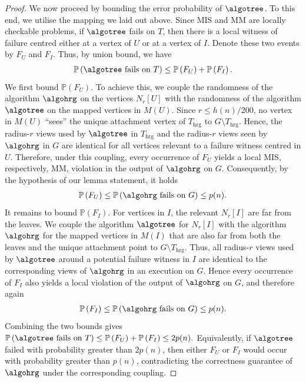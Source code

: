\documentclass[letterpaper,11pt]{article}
\newcommand{\Pro}[1]{\mathbb{P}\left(#1\right)}
\newcommand{\1}{\mathbb I}
\begin{document}
\begin{proof}
We now proceed by bounding the error probability of $\algotree$. To this end, we utilise the mapping we laid out above. Since MIS and MM are locally checkable problems, if $\algotree$ fails on $T$, then there is a local witness of failure centred either at a vertex of $U$ or at a vertex of $I$. Denote these two events by $F_U$ and $F_I$. Thus, by union bound, we have
%
\begin{align*}
\Pro{\algotree \text{ fails on } T}
\le \Pro{F_U}+\Pro{F_I}.
\end{align*}
%
We first bound $\Pro{F_U}$. To achieve this, we couple the randomness of the algorithm $\algohrg$ on the vertices $N_r[U]$ with the randomness of the algorithm $\algotree$ on the mapped vertices in $M(U)$. Since $r\le h(n)/200$, no vertex in $M(U)$ ``sees'' the unique attachment vertex of $T_{\text{hrg}}$ to $G\setminus T_{\text{hrg}}$. Hence, the radius-$r$ views used by $\algotree$ in $T_{\text{hrg}}$ and the radius-$r$ views seen by $\algohrg$ in $G$ are identical for all vertices relevant to a failure witness centred in $U$. Therefore, under this coupling, every occurrence of $F_U$ yields a local MIS, respectively, MM, violation in the output of $\algohrg$ on $G$. Consequently, by the hypothesis of our lemma statement, it holds
\begin{align*}
\Pro{F_U}\le \Pro{\algohrg \text{ fails on } G}\le p(n).
\end{align*}
%
It remains to bound $\Pro{F_I}$. For vertices in $I$, the relevant $N_r[I]$ are far from the leaves. We couple the algorithm $\algotree$ for $N_r[I]$ with the algorithm $\algohrg$ for the mapped vertices in $M(I)$ that are also far from both the leaves and the unique attachment point to $G\setminus T_{\text{hrg}}$. Thus, all radius-$r$ views used by $\algotree$ around a potential failure witness in $I$ are identical to the corresponding views of $\algohrg$ in an execution on $G$. Hence every occurrence of $F_I$ also yields a local violation of the output of $\algohrg$ on $G$, and therefore again
\begin{align*}
\Pro{F_I}\le \Pro{\algohrg \text{ fails on } G}\le p(n).
\end{align*}
%
Combining the two bounds gives
$\Pro{\algotree \text{ fails on } T}
\le \Pro{F_U}+\Pro{F_I}
\le 2p(n).$
Equivalently, if $\algotree$ failed with probability greater than $2p(n)$, then either $F_U$ or $F_I$ would occur with probability greater than $p(n)$, contradicting the correctness guarantee of $\algohrg$ under the corresponding coupling.
\end{proof}
\end{document}
